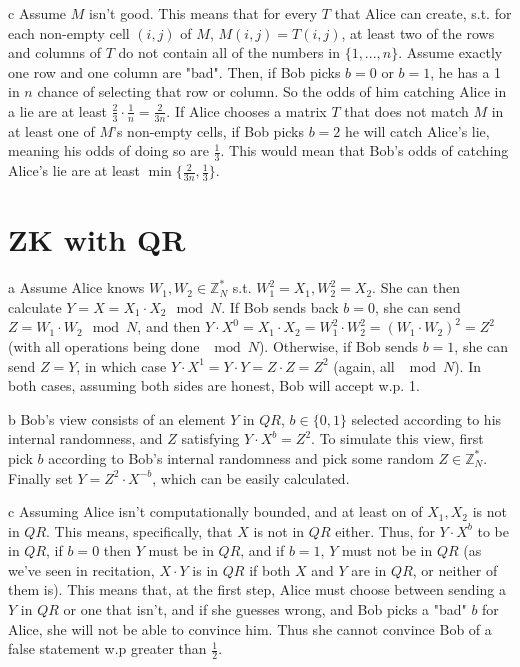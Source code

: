 \documentclass{article}
\begin{document}
\begin{paragraph}
    c Assume \(M\) isn't good. This means that for every \(T\) that Alice can create, s.t. for each non-empty cell \((i, j)\) of \(M\), \(M(i, j) = T(i, j)\), at least two of the rows and columns of \(T\) do not contain all of the numbers in \(\{1, ..., n\}\). Assume exactly one row and one column are "bad". Then, if Bob picks \(b = 0\) or \(b = 1\), he has a 1 in \(n\) chance of selecting that row or column. So the odds of him catching Alice in a lie are at least \(\frac{2}{3} \cdot \frac{1}{n} = \frac{2}{3n}\). If Alice chooses a matrix \(T\) that does not match \(M\) in at least one of \(M\)'s non-empty cells, if Bob picks \(b = 2\) he will catch Alice's lie, meaning his odds of doing so are \(\frac{1}{3}\). This would mean that Bob's odds of catching Alice's lie are at least \(\min\{\frac{2}{3n}, \frac{1}{3}\}\).
\end{paragraph}

\section{ZK with QR}
\begin{paragraph}
    a Assume Alice knows \(W_1, W_2 \in \mathbb{Z}^*_N\) s.t. \(W_1^2 = X_1, W_2^2 = X_2\). She can then calculate \(Y = X = X_1 \cdot X_2 \mod{N}\). If Bob sends back \(b = 0\), she can send \(Z = W_1 \cdot W_2 \mod{N}\), and then \(Y \cdot X^0 = X_1 \cdot X_2 = W_1^2 \cdot W_2^2 = (W_1 \cdot W_2)^2 = Z^2\) (with all operations being done \(\mod{N}\)). Otherwise, if Bob sends \(b = 1\), she can send \(Z = Y\), in which case \(Y \cdot X^1 = Y \cdot Y = Z \cdot Z = Z^2\) (again, all \(\mod{N}\)). In both cases, assuming both sides are honest, Bob will accept w.p. 1.
\end{paragraph}

\begin{paragraph}
    b Bob's view consists of an element \(Y\) in \(QR\), \(b \in \{0, 1\}\) selected according to his internal randomness, and \(Z\) satisfying \(Y \cdot X^b = Z^2\). To simulate this view, first pick \(b\) according to Bob's internal randomness and pick some random \(Z \in \mathbb{Z}^*_N\). Finally set \(Y = Z^2 \cdot X^{-b}\), which can be easily calculated.
\end{paragraph}

\begin{paragraph}
    c Assuming Alice isn't computationally bounded, and at least on of \(X_1, X_2\) is not in \(QR\). This means, specifically, that \(X\) is not in \(QR\) either. Thus, for \(Y \cdot X^b\) to be in \(QR\), if \(b = 0\) then \(Y\) must be in \(QR\), and if \(b = 1\), \(Y\) must not be in \(QR\) (as we've seen in recitation, \(X \cdot Y\) is in \(QR\) if both \(X\) and \(Y\) are in \(QR\), or neither of them is). This means that, at the first step, Alice must choose between sending a \(Y\) in \(QR\) or one that isn't, and if she guesses wrong, and Bob picks a "bad" \(b\) for Alice, she will not be able to convince him. Thus she cannot convince Bob of a false statement w.p greater than \(\frac{1}{2}\).
\end{paragraph}
\end{document}
